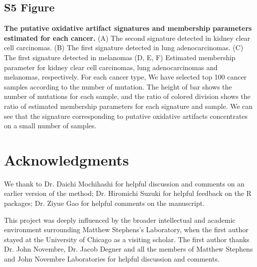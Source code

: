 \documentclass[10pt,letterpaper]{article}
\begin{document}
\subsection*{S5 Figure}
\label{oxidation}
{\bf The putative oxidative artifact signatures and membership parameters estimated for each cancer.}
(A) The second signature detected in kidney clear cell carcinomas.
(B) The first signature detected in lung adenocarcinomas.
(C) The first signature detected in melanomas
(D, E, F) Estimated membership parameter for kidney clear cell carcinomas, lung adenocarcinomas and melanomas, respectively.
For each cancer type, 
We have selected top 100 cancer samples according to the number of mutation.
The height of bar shows the number of mutations for each sample,
and the ratio of colored division shows the ratio of estimated membership parameters for each signature and sample.
We can see that the signature corresponding to putative oxidative artifacts concentrates on a small number of samples.

\section*{Acknowledgments}

We thank to Dr. Daichi Mochihashi for helpful discussion and comments on an earlier version of the method;
Dr. Hiromichi Suzuki for helpful feedback on the R packages;
Dr. Ziyue Gao for helpful comments on the manuscript.

This project was deeply influenced by the broader intellectual and academic environment surrounding Matthew Stephens's Laboratory,
when the first author stayed at the University of Chicago as a visiting scholar. The first author thanks Dr. John Novembre,
Dr. Jacob Degner and all the members of Matthew Stephens and John Novembre Laboratories for helpful discussion and comments.


\nolinenumbers


%
%
% 

% 


\end{document}
